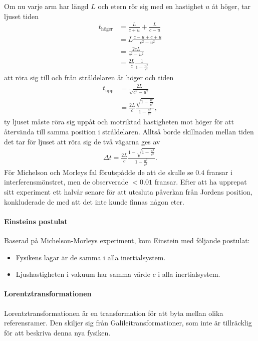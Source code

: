 Om nu varje arm har längd $L$ och etern rör sig med en hastighet $u$ åt höger, tar ljuset tiden
\begin{align*}
	t_{\text{höger}} &= \frac{L}{c + u} + \frac{L}{c - u} \\
	                 &= L\frac{c - u + c + u}{c^{2} - u^{2}} \\
	                 &= \frac{2cL}{c^{2} - u^{2}} \\
	                 &= \frac{2L}{c}\frac{1}{1 - \frac{u^{2}}{c^{2}}}
\end{align*}
att röra sig till och från stråldelaren åt höger och tiden
\begin{align*}
	t_{\text{upp}} &= \frac{2L}{\sqrt{c^{2} - u^{2}}} \\
	               &= \frac{2L}{c}\frac{\sqrt{1 - \frac{u^{2}}{c^{2}}}}{1 - \frac{u^{2}}{c^{2}}},
\end{align*}
ty ljuset måste röra sig uppåt och motriktad hastigheten mot höger för att återvända till samma position i stråldelaren. Alltså borde skillnaden mellan tiden det tar för ljuset att röra sig de två vägarna ges av
\begin{align*}
	\Delta t = \frac{2L}{c}\frac{1 - \sqrt{1 - \frac{u^{2}}{c^{2}}}}{1 - \frac{u^{2}}{c^{2}}}.
\end{align*}
För Michelson och Morleys fal förutspådde de att de skulle se $0.4$ fransar i interferensmönstret, men de observerade $< 0.01$ fransar. Efter att ha upprepat sitt experiment ett halvår senare för att utesluta påverkan från Jordens position, konkluderade de med att det inte kunde finnas någon eter.

\paragraph{Einsteins postulat}
Baserad på Michelson-Morleys experiment, kom Einstein med följande postulat:
\begin{itemize}
	\item Fysikens lagar är de samma i alla inertialsystem.
	\item Ljushastigheten i vakuum har samma värde $c$ i alla inertialsystem.
\end{itemize}

\paragraph{Lorentztransformationen}
Lorentztransformationen är en transformation för att byta mellan olika referensramer. Den skiljer sig från Galileitransformationer, som inte är tillräcklig för att beskriva denna nya fysiken.


